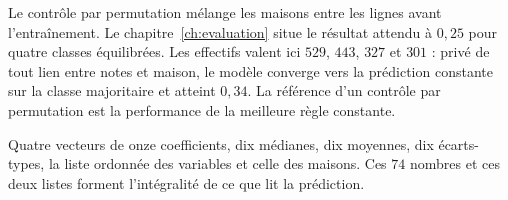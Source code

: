 Le contrôle par permutation mélange les maisons entre les lignes avant
l'entraînement. Le chapitre~\ref{ch:evaluation} situe le résultat attendu à
$0{,}25$ pour quatre classes équilibrées. Les effectifs valent ici $529$, $443$,
$327$ et $301$ : privé de tout lien entre notes et maison, le modèle converge
vers la prédiction constante sur la classe majoritaire et atteint $0{,}34$. La
référence d'un contrôle par permutation est la performance de la meilleure règle
constante.

\begin{resultat}
Quatre vecteurs de onze coefficients, dix médianes, dix moyennes, dix
écarts-types, la liste ordonnée des variables et celle des maisons. Ces $74$
nombres et ces deux listes forment l'intégralité de ce que lit la prédiction.
\end{resultat}

